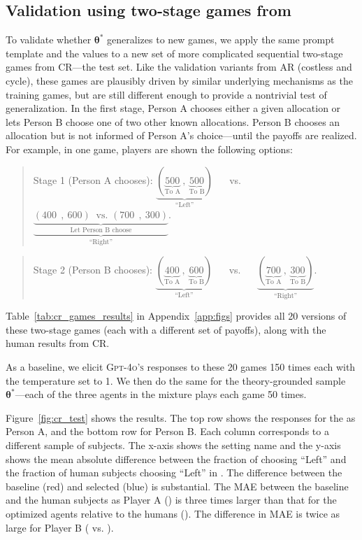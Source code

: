 \subsection{Validation using two-stage games from \cite{charness2002understanding}}
\label{sec:validate_prompt}

To validate whether $\bm{\theta}^*$ generalizes to new games, we apply the same prompt template and the values to a new set of more complicated sequential two-stage games from CR---the test set.
Like the validation variants from AR (costless and cycle), these games are plausibly driven by similar underlying mechanisms as the training games, but are still different enough to provide a nontrivial test of generalization.
In the first stage, Person A chooses either a given allocation or lets Person B choose one of two other known allocations.
Person B chooses an allocation but is not informed of Person A's choice---until the payoffs are realized.
For example, in one game, players are shown the following options:
\begin{quote}
Stage 1 (Person A chooses): $\underbrace{(\underbrace{500}_{\mbox{To A}}\:, \:\underbrace{500}_{\mbox{To B}})}_{\mbox{``Left''}}$ $\quad$ vs. $\quad$  $\underbrace{\underbrace{(400\:\:,\:600)\:\text{    vs.  }(700\:\:,\: 300)}_{\mbox{Let Person B choose}}}_{\mbox{``Right''}}$.
\end{quote}
\begin{quote}
Stage 2  (Person B chooses): $\underbrace{(\underbrace{400}_{\mbox{To A}}\:,\: \underbrace{600}_{\mbox{To B}})}_{\mbox{``Left''}}$ $\quad$ vs. $\quad$ $\underbrace{(\underbrace{700}_{\mbox{To A}}\:,\: \underbrace{300}_{\mbox{To B}})}_{\mbox{``Right''}}$.
\end{quote}
Table~\ref{tab:cr_games_results} in Appendix~\ref{app:figs} provides all 20 versions of these two-stage games (each with a different set of payoffs), along with the human results from CR.

As a baseline, we elicit \textsc{Gpt-4o's} responses to these 20 games 150 times each with the temperature set to 1.
We then do the same for the theory-grounded sample $\bm{\theta}^*$---each of the three agents in the mixture plays each game 50 times.

Figure~\ref{fig:cr_test} shows the results. 
The top row shows the responses for the  as Person A, and the bottom row for Person B.
Each column corresponds to a different sample of subjects.
The x-axis shows the setting name and the y-axis shows the mean absolute difference between the fraction of  choosing ``Left'' and the fraction of human subjects choosing ``Left'' in \citeauthor{charness2002understanding}.
The difference between the baseline (red) and selected  (blue) is substantial.
The MAE between the baseline and the human subjects as Player A (\CRTestBaselineGameAMAE) is three times larger than that for the optimized agents relative to the humans (\CRTestOptGameAMAE).
The difference in MAE is twice as large for Player B (\CRTestBaselineGameBMAE{} vs. \CRTestOptGameBMAE).

